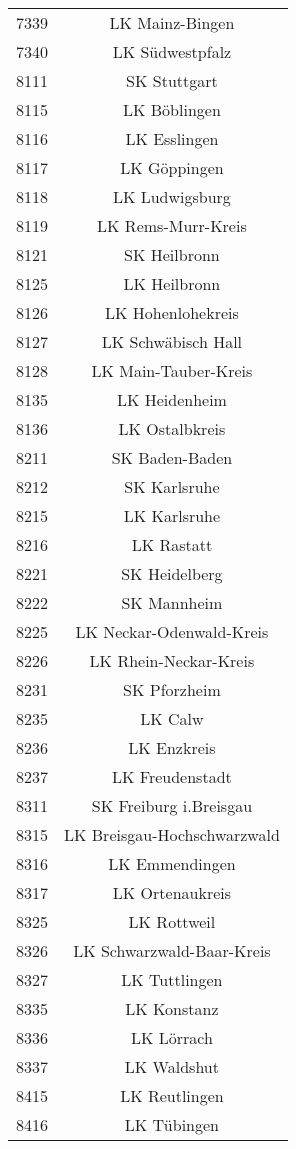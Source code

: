 \begin{tabular}{c c}
    7339&LK Mainz-Bingen\\ 
    7340&LK Südwestpfalz\\ 
    8111&SK Stuttgart\\ 
    8115&LK Böblingen\\ 
    8116&LK Esslingen\\ 
    8117&LK Göppingen\\ 
    8118&LK Ludwigsburg\\ 
    8119&LK Rems-Murr-Kreis\\ 
    8121&SK Heilbronn\\ 
    8125&LK Heilbronn\\ 
    8126&LK Hohenlohekreis\\ 
    8127&LK Schwäbisch Hall\\ 
    8128&LK Main-Tauber-Kreis\\ 
    8135&LK Heidenheim\\ 
    8136&LK Ostalbkreis\\ 
    8211&SK Baden-Baden\\ 
    8212&SK Karlsruhe\\ 
    8215&LK Karlsruhe\\ 
    8216&LK Rastatt\\ 
    8221&SK Heidelberg\\ 
    8222&SK Mannheim\\ 
    8225&LK Neckar-Odenwald-Kreis\\ 
    8226&LK Rhein-Neckar-Kreis\\ 
    8231&SK Pforzheim\\ 
    8235&LK Calw\\ 
    8236&LK Enzkreis\\ 
    8237&LK Freudenstadt\\ 
    8311&SK Freiburg i.Breisgau\\ 
    8315&LK Breisgau-Hochschwarzwald\\ 
    8316&LK Emmendingen\\ 
    8317&LK Ortenaukreis\\ 
    8325&LK Rottweil\\ 
    8326&LK Schwarzwald-Baar-Kreis\\ 
    8327&LK Tuttlingen\\ 
    8335&LK Konstanz\\ 
    8336&LK Lörrach\\ 
    8337&LK Waldshut\\ 
    8415&LK Reutlingen\\ 
    8416&LK Tübingen\\ 

\end{tabular}
